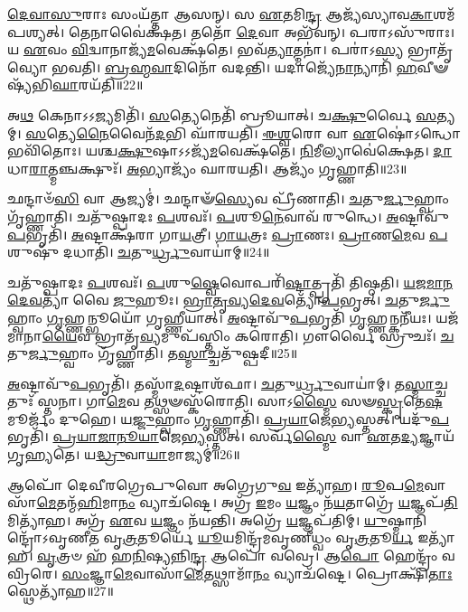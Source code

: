 \-\ul{𑌦𑍇}\-\-\ul{𑌵𑌾}\-\-\ul{𑌸𑍁}\-𑌰𑌾𑌃 𑌸𑌂𑌯᳴𑌤𑍍𑌤𑌾 𑌆𑌸𑌨𑍍।
𑌸 \ul{𑌏}\-𑌤𑌮𑌿\-\ul{𑌨𑍍𑌦𑍍𑌰} 𑌆𑌜𑍍𑌯᳴𑌸𑍍𑌯𑌾𑌵\-\-\ul{𑌕𑌾}\-𑌶𑌮᳴\-𑌪𑌶𑍍𑌯𑌤𑍍।
𑌤𑍇𑌨𑌾𑌵𑍈॑𑌕𑍍𑌷𑌤।
𑌤𑌤𑍋᳴ \ul{𑌦𑍇}\-𑌵𑌾 𑌅𑌭᳴𑌵𑌨𑍍।
𑌪𑌰𑌾𑌽𑌸𑍁᳴𑌰𑌾𑌃।
𑌯 \ul{𑌏}\-𑌵𑌂 \ul{𑌵𑌿}\-𑌦𑍍𑌵𑌾𑌨𑌾𑌜𑍍𑌯᳴\-\ul{𑌮}\-𑌵𑍇𑌕𑍍𑌷᳴𑌤𑍇।
𑌭𑌵᳴\-\ul{𑌤𑍍𑌯𑌾}\-𑌤𑍍𑌮𑌨𑌾॑।
𑌪𑌰𑌾॑𑌽\-\ul{𑌸𑍍𑌯} 𑌭𑍍𑌰𑌾𑌤𑍃᳴𑌵𑍍𑌯𑍋 𑌭𑌵𑌤𑌿।
\-\ul{𑌬𑍍𑌰}\-\-\ul{𑌹𑍍𑌮}\-\-\ul{𑌵𑌾}\-𑌦𑌿𑌨𑍋᳴ 𑌵𑌦𑌨𑍍𑌤𑌿।
𑌯𑌦𑌾𑌜𑍍𑌯𑍇᳴\-\ul{𑌨𑌾}\-𑌨𑍍𑌯𑌾𑌨𑌿᳴ \ul{𑌹}\-𑌵𑍀𑍟𑌷𑍍𑌯᳴𑌭𑌿\-\ul{𑌘𑌾}\-𑌰𑌯᳴𑌤𑌿॥22॥

𑌅\-\ul{𑌥} 𑌕𑍇𑌨𑌾𑌽𑌽\-\ul{𑌜𑍍𑌯}\-𑌮𑌿𑌤𑌿᳴।
\-\ul{𑌸}\-𑌤𑍍𑌯𑍇𑌨𑍇𑌤𑌿᳴ 𑌬𑍍𑌰𑍂𑌯𑌾𑌤𑍍।
𑌚\-\ul{𑌕𑍍𑌷𑍁}\-𑌰𑍍𑌵𑍈 \ul{𑌸}\-𑌤𑍍𑌯𑌮𑍍।
\-\ul{𑌸}\-𑌤𑍍𑌯𑍇\-\ul{𑌨𑍈}\-𑌵𑍈𑌨᳴\-\ul{𑌦}\-𑌭𑌿 𑌘𑌾᳴𑌰𑌯𑌤𑌿।
\-\ul{𑌈}\-\-\ul{𑌶𑍍𑌵}\-𑌰𑍋 𑌵𑌾 \ul{𑌏}\-𑌷𑍋॑\-𑌽𑌨𑍍𑌧𑍋 𑌭𑌵𑌿᳴𑌤𑍋𑌃।
𑌯𑌶𑍍𑌚\-\ul{𑌕𑍍𑌷𑍁}\-𑌷𑌾\-𑌽𑌽𑌜𑍍𑌯᳴\-\ul{𑌮}\-𑌵𑍇𑌕𑍍𑌷᳴𑌤𑍇।
\-\ul{𑌨𑌿}\-𑌮𑍀𑌲𑍍𑌯𑌾𑌵𑍇॑𑌕𑍍𑌷𑍇𑌤।
\-\ul{𑌦𑌾}\-𑌧𑌾\-\ul{𑌰𑌾}\-𑌤𑍍𑌮𑌞𑍍𑌚𑌕𑍍𑌷𑍁𑌃᳴।
\-\ul{𑌅}\-𑌭𑍍𑌯𑌾𑌜𑍍𑌯𑌂᳴ 𑌘𑌾𑌰𑌯𑌤𑌿।
𑌆𑌜𑍍𑌯𑌂᳴ 𑌗𑍃𑌹𑍍𑌣𑌾𑌤𑌿॥23॥

𑌛𑌨𑍍𑌦𑌾𑍞᳴\-\ul{𑌸𑌿} 𑌵𑌾 𑌆𑌜𑍍𑌯𑌮𑍍॑।
𑌛𑌨𑍍𑌦𑌾𑍟᳴\-\ul{𑌸𑍍𑌯𑍇}\-𑌵 𑌪𑍍𑌰𑍀᳴𑌣𑌾𑌤𑌿।
\-\ul{𑌚}\-𑌤𑍁\-\ul{𑌰𑍍𑌜𑍁}\-𑌹𑍍𑌵𑌾𑌂 𑌗𑍃᳴𑌹𑍍𑌣𑌾𑌤𑌿।
𑌚𑌤𑍁᳴𑌷𑍍𑌪𑌾𑌦𑌃 \ul{𑌪}\-𑌶𑌵𑌃᳴।
\-\ul{𑌪}\-𑌶𑍂\-\ul{𑌨𑍇}\-𑌵𑌾𑌵᳴ 𑌰𑍁𑌨𑍍𑌧𑍇।
\-\ul{𑌅}\-𑌷𑍍𑌟𑌾𑌵𑍁᳴\-\ul{𑌪}\-𑌭𑍃𑌤𑌿᳴।
\-\ul{𑌅}\-𑌷𑍍𑌟𑌾𑌕𑍍𑌷᳴𑌰𑌾 𑌗𑌾\-\ul{𑌯}\-𑌤𑍍𑌰𑍀।
\-\ul{𑌗𑌾}\-\-\ul{𑌯}\-𑌤𑍍𑌰𑌃 \ul{𑌪𑍍𑌰𑌾}\-𑌣𑌃।
\-\ul{𑌪𑍍𑌰𑌾}\-𑌣\-\ul{𑌮𑍇}\-𑌵 \ul{𑌪}\-𑌶𑍁𑌷𑍁᳴ 𑌦𑌧𑌾𑌤𑌿।
\-\ul{𑌚}\-𑌤𑍁\-\ul{𑌰𑍍𑌧𑍍𑌰𑍁}\-𑌵𑌾𑌯𑌾॑𑌮𑍍॥24॥

𑌚𑌤𑍁᳴𑌷𑍍𑌪𑌾𑌦𑌃 \ul{𑌪}\-𑌶𑌵𑌃᳴।
\-\ul{𑌪}\-𑌶𑍁\-\ul{𑌷𑍍𑌵𑍇}\-𑌵𑍋𑌪𑌰𑌿᳴\-\ul{𑌷𑍍𑌟𑌾}\-𑌤𑍍𑌪𑍍𑌰𑌤𑌿᳴ 𑌤𑌿𑌷𑍍𑌠𑌤𑌿।
\-\ul{𑌯}\-\-\ul{𑌜}\-\-\ul{𑌮𑌾}\-\-\ul{𑌨}\-\-\ul{𑌦𑍇}\-\-\ul{𑌵}\-𑌤𑍍𑌯𑌾᳴ 𑌵𑍈 \ul{𑌜𑍁}\-𑌹𑍂𑌃।
\-\ul{𑌭𑍍𑌰𑌾}\-\-\ul{𑌤𑍃}\-\-\ul{𑌵𑍍𑌯}\-\-\ul{𑌦𑍇}\-\-\ul{𑌵}\-𑌤𑍍𑌯𑍋᳴\-\ul{𑌪}\-𑌭𑍃𑌤𑍍।
\-\ul{𑌚}\-𑌤𑍁\-\ul{𑌰𑍍𑌜𑍁}\-𑌹𑍍𑌵𑌾𑌂 \ul{𑌗𑍃}\-𑌹𑍍𑌣𑌨𑍍𑌭𑍂𑌯𑍋᳴ 𑌗𑍃𑌹𑍍𑌣𑍀𑌯𑌾𑌤𑍍।
\-\ul{𑌅}\-𑌷𑍍𑌟𑌾𑌵𑍁᳴\-\ul{𑌪}\-𑌭𑍃𑌤𑌿᳴ \ul{𑌗𑍃}\-𑌹𑍍𑌣𑌨𑍍𑌕𑌨𑍀᳴𑌯𑌃।
𑌯𑌜᳴𑌮𑌾𑌨𑌾\-\ul{𑌯𑍈}\-𑌵 𑌭𑍍𑌰𑌾𑌤𑍃᳴\-\ul{𑌵𑍍𑌯}\-𑌮𑍁𑌪᳴𑌸𑍍𑌤𑌿𑌂 𑌕𑌰𑍋𑌤𑌿।
𑌗𑍗𑌰𑍍𑌵𑍈 𑌸𑍍𑌰𑍁𑌚𑌃᳴।
\-\ul{𑌚}\-𑌤𑍁\-\ul{𑌰𑍍𑌜𑍁}\-𑌹𑍍𑌵𑌾𑌂 𑌗𑍃᳴𑌹𑍍𑌣𑌾𑌤𑌿।
𑌤\-\ul{𑌸𑍍𑌮𑌾}\-𑌚𑍍𑌚𑌤𑍁᳴𑌷𑍍𑌪𑌦𑍀॥25॥

\-\ul{𑌅}\-𑌷𑍍𑌟𑌾𑌵𑍁᳴\-\ul{𑌪}\-𑌭𑍃𑌤𑌿᳴।
𑌤𑌸𑍍𑌮𑌾᳴\-\ul{𑌦}\-𑌷𑍍𑌟𑌾𑌶᳴𑌫𑌾।
\-\ul{𑌚}\-𑌤𑍁\-\ul{𑌰𑍍𑌧𑍍𑌰𑍁}\-𑌵𑌾𑌯𑌾॑𑌮𑍍।
𑌤\-\ul{𑌸𑍍𑌮𑌾}\-𑌚𑍍𑌚𑌤𑍁𑌃᳴ 𑌸𑍍𑌤𑌨𑌾।
𑌗𑌾\-\ul{𑌮𑍇}\-𑌵 𑌤𑌥𑍍𑌸𑍟𑌸𑍍𑌕᳴𑌰𑍋𑌤𑌿।
𑌸𑌾𑌽\-\ul{𑌸𑍍𑌮𑍈} 𑌸𑍟\-\ul{𑌸𑍍𑌕𑍃}\-𑌤𑍇\-\ul{𑌷}\-𑌮𑍂𑌰𑍍𑌜𑌂᳴ 𑌦𑍁𑌹𑍇।
𑌯\-\ul{𑌜𑍍𑌜𑍁}\-𑌹𑍍𑌵𑌾𑌂 \ul{𑌗𑍃}\-𑌹𑍍𑌣𑌾𑌤𑌿᳴।
\-\ul{𑌪𑍍𑌰}\-\-\ul{𑌯𑌾}\-𑌜𑍇\-\ul{𑌭𑍍𑌯}\-𑌸𑍍𑌤𑌤𑍍।
𑌯𑌦𑍁᳴\-\ul{𑌪}\-𑌭𑍃𑌤𑌿᳴।
\-\ul{𑌪𑍍𑌰}\-\-\ul{𑌯𑌾}\-\-\ul{𑌜𑌾}\-\-\ul{𑌨𑍂}\-\-\ul{𑌯𑌾}\-𑌜𑍇\-\ul{𑌭𑍍𑌯}\-𑌸𑍍𑌤𑌤𑍍।
𑌸𑌰𑍍𑌵᳴\-\ul{𑌸𑍍𑌮𑍈} 𑌵𑌾 \ul{𑌏}\-𑌤\-\ul{𑌦𑍍𑌯}\-𑌜𑍍𑌞𑌾𑌯᳴ 𑌗𑍃𑌹𑍍𑌯𑌤𑍇।
𑌯\-\ul{𑌦𑍍𑌧𑍍𑌰𑍁}\-𑌵𑌾\-\ul{𑌯𑌾}\-𑌮𑌾𑌜𑍍𑌯𑌮𑍍॑॥26॥\anuvakamend[\-\ul{𑌅}\-\-\ul{𑌭𑌿}\-\-\ul{𑌘𑌾}\-𑌰𑌯᳴𑌤𑌿 𑌗𑍃𑌹𑍍𑌣𑌾𑌤𑌿 \ul{𑌧𑍍𑌰𑍁}\-𑌵𑌾\-\ul{𑌯𑌾𑌂} 𑌚𑌤𑍁᳴𑌷𑍍𑌪𑌦𑍀 𑌪𑍍𑌰𑌯𑌾𑌜𑌾𑌨𑍂\-\ul{𑌯𑌾}\-𑌜𑍇\-\ul{𑌭𑍍𑌯}\-𑌸𑍍𑌤𑌦𑍍𑌦𑍍𑌵𑍇 𑌚᳴]

𑌆𑌪𑍋᳴ 𑌦𑍇𑌵𑍀𑌰𑌗𑍍𑌰𑍇𑌪𑍁𑌵𑍋 𑌅𑌗𑍍𑌰𑍇𑌗𑍁\-\ul{𑌵} 𑌇𑌤𑍍𑌯𑌾᳴𑌹।
\-\ul{𑌰𑍂}\-𑌪\-\ul{𑌮𑍇}\-𑌵𑌾𑌸𑌾᳴\-\ul{𑌮𑍇}\-𑌤𑌨𑍍𑌮᳴\-\ul{𑌹𑌿}\-\-𑌮𑌾\-\ul{𑌨𑌂} 𑌵𑍍𑌯𑌾𑌚᳴𑌷𑍍𑌟𑍇।
𑌅𑌗𑍍𑌰᳴ \ul{𑌇}\-𑌮𑌂 \ul{𑌯}\-𑌜𑍍𑌞𑌂 𑌨᳴\-\ul{𑌯}\-𑌤𑌾𑌗𑍍𑌰𑍇᳴ \ul{𑌯}\-𑌜𑍍𑌞𑌪᳴\-\ul{𑌤𑌿}\-𑌮𑌿𑌤𑍍𑌯𑌾᳴𑌹।
𑌅𑌗𑍍𑌰᳴ \ul{𑌏}\-𑌵 \ul{𑌯}\-𑌜𑍍𑌞𑌂 𑌨᳴𑌯𑌨𑍍𑌤𑌿।
𑌅𑌗𑍍𑌰𑍇᳴ \ul{𑌯}\-𑌜𑍍𑌞𑌪᳴𑌤𑌿𑌮𑍍।
\-\ul{𑌯𑍁}\-𑌷𑍍𑌮𑌾𑌨𑌿𑌨𑍍𑌦𑍍𑌰𑍋᳴\-𑌽𑌵𑍃𑌣𑍀𑌤 𑌵𑍃\-\ul{𑌤𑍍𑌰}\-𑌤𑍂𑌰𑍍𑌯𑍇᳴ \ul{𑌯𑍂}\-𑌯𑌮𑌿𑌨𑍍𑌦𑍍𑌰᳴𑌮𑌵𑍃𑌣𑍀𑌧𑍍𑌵𑌂 𑌵𑍃\-\ul{𑌤𑍍𑌰}\-𑌤𑍂\-\ul{𑌰𑍍𑌯} 𑌇𑌤𑍍𑌯𑌾᳴𑌹।
\-\ul{𑌵𑍃}\-𑌤𑍍𑌰𑍞 𑌹᳴ 𑌹\-\ul{𑌨𑌿}\-𑌷𑍍𑌯𑌨𑍍𑌨𑌿\-\ul{𑌨𑍍𑌦𑍍𑌰} 𑌆𑌪𑍋᳴ 𑌵𑌵𑍍𑌰𑍇।
𑌆\-\ul{𑌪𑍋} 𑌹𑍇𑌨𑍍𑌦𑍍𑌰𑌂᳴ 𑌵𑌵𑍍𑌰𑌿𑌰𑍇।
\-\ul{𑌸𑌂}\-𑌜𑍍𑌞𑌾\-\ul{𑌮𑍇}\-𑌵𑌾𑌸𑌾᳴\-\ul{𑌮𑍇}\-𑌤𑌥𑍍𑌸𑌾𑌮𑌾᳴\-\ul{𑌨𑌂} 𑌵𑍍𑌯𑌾𑌚᳴𑌷𑍍𑌟𑍇।
𑌪𑍍𑌰𑍋𑌕𑍍𑌷𑌿᳴\-\ul{𑌤𑌾𑌃} 𑌸𑍍𑌥𑍇𑌤𑍍𑌯𑌾᳴𑌹॥27॥

